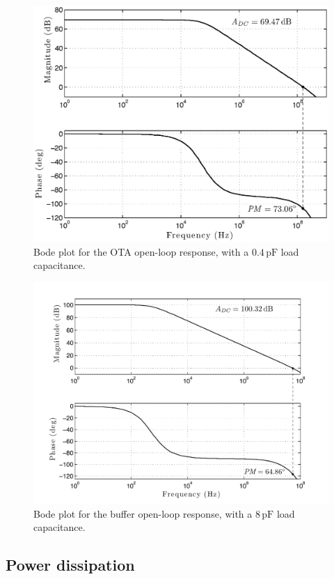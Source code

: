 \begin{figure}[!t]
	\centering
	\includegraphics[width=5.3in]{./Test/bode_OTA_post}
	\caption{Bode plot for the OTA open-loop response, with a $0.4\,\text{pF}$ load capacitance.}\label{fig:bode_OTA}
\end{figure}

\begin{figure}[!t]
	\centering
	\includegraphics[width=5.3in]{./Test/bode_buffer_post}
	\caption{Bode plot for the buffer open-loop response, with a $8\,\text{pF}$ load capacitance.}\label{fig:bode_buffer}
\end{figure}

\subsection{Power dissipation} 


